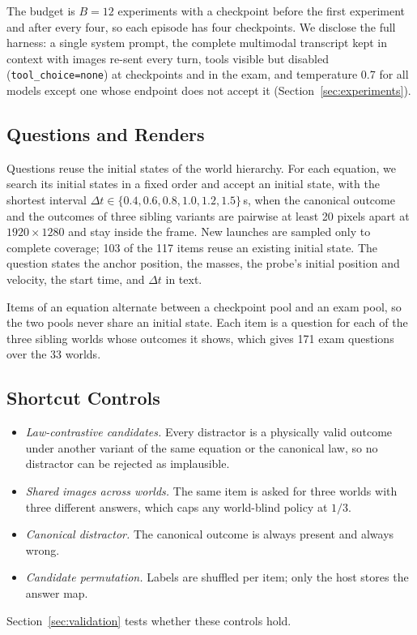 The budget is $B=12$ experiments with a checkpoint before the first experiment and after every four, so each episode has four checkpoints. We disclose the full harness: a single system prompt, the complete multimodal transcript kept in context with images re-sent every turn, tools visible but disabled (\texttt{tool\_choice=none}) at checkpoints and in the exam, and temperature 0.7 for all models except one whose endpoint does not accept it (Section~\ref{sec:experiments}).

\subsection{Questions and Renders}

Questions reuse the initial states of the world hierarchy. For each equation, we search its initial states in a fixed order and accept an initial state, with the shortest interval $\Delta t\in\{0.4,0.6,0.8,1.0,1.2,1.5\}$\,s, when the canonical outcome and the outcomes of three sibling variants are pairwise at least 20 pixels apart at $1920\times1280$ and stay inside the frame. New launches are sampled only to complete coverage; 103 of the 117 items reuse an existing initial state. The question states the anchor position, the masses, the probe's initial position and velocity, the start time, and $\Delta t$ in text.

Items of an equation alternate between a checkpoint pool and an exam pool, so the two pools never share an initial state. Each item is a question for each of the three sibling worlds whose outcomes it shows, which gives 171 exam questions over the 33 worlds.

\subsection{Shortcut Controls}
\label{sec:construction:antishortcut}

\begin{itemize}
  \item \emph{Law-contrastive candidates.} Every distractor is a physically valid outcome under another variant of the same equation or the canonical law, so no distractor can be rejected as implausible.
  \item \emph{Shared images across worlds.} The same item is asked for three worlds with three different answers, which caps any world-blind policy at $1/3$.
  \item \emph{Canonical distractor.} The canonical outcome is always present and always wrong.
  \item \emph{Candidate permutation.} Labels are shuffled per item; only the host stores the answer map.
\end{itemize}
Section~\ref{sec:validation} tests whether these controls hold.

